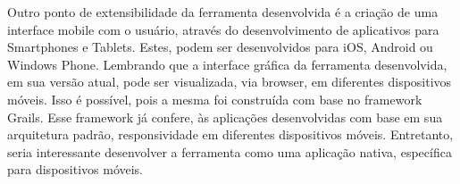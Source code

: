 Outro ponto de extensibilidade da ferramenta desenvolvida é a criação de uma interface mobile com o usuário, através do desenvolvimento de aplicativos para Smartphones e Tablets. Estes, podem ser desenvolvidos para iOS, Android ou Windows Phone. Lembrando que a interface gráfica da ferramenta desenvolvida, em sua versão atual, pode ser visualizada, via browser, em diferentes dispositivos móveis. Isso é possível, pois a mesma foi construída com base no framework Grails. Esse framework já confere, às aplicações desenvolvidas com base em sua arquitetura padrão, responsividade em diferentes dispositivos móveis. Entretanto, seria interessante desenvolver a ferramenta como uma aplicação nativa, específica para dispositivos móveis.

